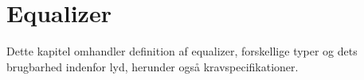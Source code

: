 \chapter{Equalizer}\label{kap:equalizer}

Dette kapitel omhandler definition af equalizer, forskellige typer
og dets brugbarhed indenfor lyd, herunder også kravspecifikationer.
